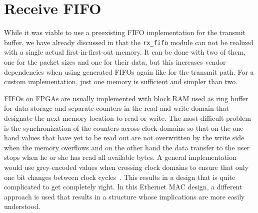 \documentclass[a4paper, 11pt, oneside]{Thesis}  %
\begin{document}
\section{Receive FIFO}

While it was viable to use a preexisting FIFO implementation for the transmit buffer, we have already discussed in  that the \texttt{rx\_fifo} module can not be realized with a single actual first-in-first-out memory. It can be done with two of them, one for the packet sizes and one for their data, but this increases vendor dependencies when using generated FIFOs again like for the transmit path. For a custom implementation, just one memory is sufficient and simpler than two.

FIFOs on FPGAs are usually implemented with block RAM used as ring buffer for data storage and separate counters in the read and write domain that designate the next memory location to read or write. The most difficult problem is the synchronization of the counters across clock domains so that on the one hand values that have yet to be read out are not overwritten by the write side when the memory overflows and on the other hand the data transfer to the user stops when he or she has read all available bytes. A general implementation would use grey-encoded values when crossing clock domains to ensure that only one bit changes between clock cycles~\cite{RTLHardwareDesign}. This results in a design that is quite complicated to get completely right. In this Ethernet MAC design, a different approach is used that results in a structure whose implications are more easily understood.
\end{document}
